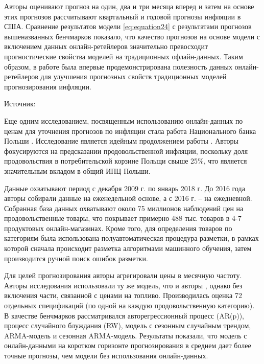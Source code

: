 Авторы оценивают прогноз на один, два и три месяца вперед и затем на основе этих прогнозов рассчитывают квартальный и годовой прогнозы инфляции в США. Сравнение результатов модели \cref{eq:equation24} с результатами прогнозов вышеназванных бенчмарков показало, что качество прогнозов на основе модели с включением данных онлайн-ретейлеров значительно превосходит прогностические свойства моделей на традиционных офлайн-данных. Таким образом, в работе была впервые продемонстрирована полезность данных онлайн-ретейлеров для улучшения прогнозных свойств традиционных моделей прогнозирования инфляции.

\begin{table}[h!]
	\centering
	\caption{Среднеквадратичные оценки прогнозов из работы \cite{aparicio2020forecasting}}
	\label{tab:inflation_forecasts}
	\vspace{1ex}
	\raggedright
	\small{Источник: \cite{aparicio2020forecasting}}
\end{table}


Еще одним исследованием, посвященным использованию онлайн-данных по ценам для уточнения прогнозов по инфляции стала работа Национального банка Польши \cite{macias2023nowcasting}. Исследование является идейным продолжением работы \cite{aparicio2020forecasting}. Авторы фокусируются на предсказании продовольственной инфляции, поскольку доля продовольствия в потребительской корзине Польщи свыше 25\%, что является значительным вкладом в общий ИПЦ Польши.

Данные охватывают период с декабря 2009 г. по январь 2018 г. До 2016 года авторы собирали данные на еженедельной основе, а с 2016 г. – на ежедневной. Собранная база данных охватывают около 75 миллионов наблюдений цен на продовольственные товары, что покрывает примерно 488 тыс. товаров в 4-7 продуктовых онлайн-магазинах. Кроме того, для определения товаров по категориям была использована полуавтоматическая процедура разметки, в рамках которой сначала происходит разметка алгоритмами машинного обучения, затем производится ручной поиск ошибок разметки.

Для целей прогнозирования авторы агрегировали цены в месячную частоту. Авторы исследования использовали ту же модель, что и авторы \cite{aparicio2020forecasting}, однако без включения части, связанной с ценами на топливо. Производилась оценка 72 отдельных спецификаций (по одной на каждую продовольственную категорию). В качестве бенчмарков рассматривался авторегрессионный процесс (AR(p)), процесс случайного блуждания (RW), модель с сезонным случайным трендом, ARMA-модель и сезонная ARMA-модель. Результаты показали, что модель с онлайн-данными на коротком горизонте прогнозирования в среднем дает более точные прогнозы, чем модели без использования онлайн-данных.

